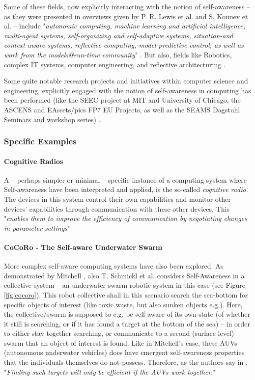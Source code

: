 \documentclass{article}
\begin{document}
Some of these fields, now explicitly interacting with the notion of self-awareness -- as they were presented in overviews given by P. R. Lewis et al. \cite{sacs17_ch3} and S. Kounev et al. \cite{sacs17_ch1} -- include "\textit{autonomic computing, machine learning and artificial intelligence, multi-agent systems, self-organizing and self-adaptive systems, situation-and context-aware systems, reflective computing, model-predictive control, as well as work from the models@run-time community}" \cite{sacs17_ch1}. But also, fields like Robotics, complex IT systems, computer engineering, and reflective architecturing \cite{sacs17_ch3}.

Some quite notable research projects and initiatives within computer science and engineering, explicitly engaged with the notion of self-awareness in computing has been performed (like the SEEC project at MIT and University of Chicago, the ASCENS and EAssets/pics FP7 EU Projects, as well as the SEAMS Dagstuhl Seminars and workshop series) \cite{sacs17_ch1}.


\subsubsection{Specific Examples}

\paragraph{Cognitive Radios}

A -- perhaps simpler or minimal -- specific instance of a computing system where Self-awareness have been interpreted and applied, is the so-called \textit{cognitive radio}. The devices in this system control their own capabilities and monitor other devices' capabilities through communication with these other devices. This "\textit{enables them to improve the efficiency of communication by negotiating changes in parameter settings}" \cite{sacs17_ch3}

\paragraph{CoCoRo - The Self-aware Underwater Swarm}

More complex self-aware computing systems have also been explored. As demonstrated by Mitchell \cite{mitchell}, also T. Schmickl et al. considers Self-Awareness in a collective system -- an underwater swarm robotic system \cite{cocoro} in this case (see Figure \ref{fig:cocoro}). This robot collective shall in this scenario search the sea-bottom for specific objects of interest (like toxic waste, but also sunken objects e.g.). Here, the collective/swarm is supposed to e.g. be self-aware of its own state (of whether it still is searching, or if it has found a target at the bottom of the sea) -- in order to either stay together searching, or communicate to a second (surface level) swarm that an object of interest is found. Like in Mitchell's case, these AUVs (autonomous underwater vehicles) does have emergent self-awareness properties that the individuals themselves do not possess. Therefore, as the authors say in \cite{cocoro}, "\textit{Finding such targets will only be efficient if the AUVs work together}."
\end{document}
